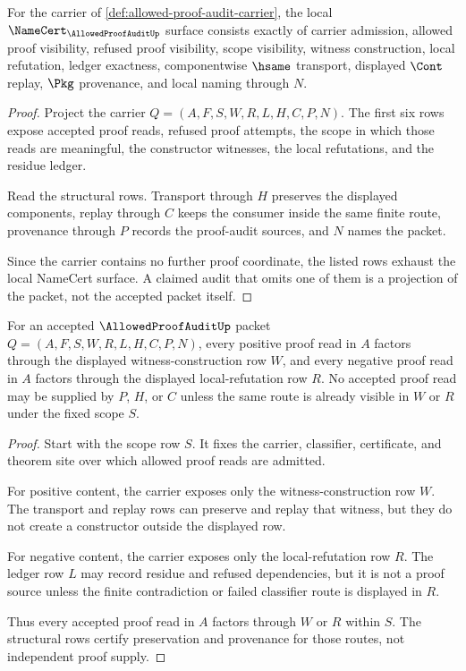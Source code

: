 \begin{theorem}
\label{thm:allowed-proof-audit-namecert-obligations}
For the carrier of \autoref{def:allowed-proof-audit-carrier}, the local $\NameCert_{\AllowedProofAuditUp}$ surface consists exactly of carrier admission, allowed proof visibility, refused proof visibility, scope visibility, witness construction, local refutation, ledger exactness, componentwise $\hsame$ transport, displayed $\Cont$ replay, $\Pkg$ provenance, and local naming through $N$.
\end{theorem}
\begin{proof}
Project the carrier $Q=(A,F,S,W,R,L,H,C,P,N)$. The first six rows expose accepted proof reads, refused proof attempts, the scope in which those reads are meaningful, the constructor witnesses, the local refutations, and the residue ledger.

Read the structural rows. Transport through $H$ preserves the displayed components, replay through $C$ keeps the consumer inside the same finite route, provenance through $P$ records the proof-audit sources, and $N$ names the packet.

Since the carrier contains no further proof coordinate, the listed rows exhaust the local NameCert surface. A claimed audit that omits one of them is a projection of the packet, not the accepted packet itself.
\end{proof}

\begin{theorem}
\label{thm:allowed-proof-audit-witness-construction}
For an accepted $\AllowedProofAuditUp$ packet $Q=(A,F,S,W,R,L,H,C,P,N)$, every positive proof read in $A$ factors through the displayed witness-construction row $W$, and every negative proof read in $A$ factors through the displayed local-refutation row $R$. No accepted proof read may be supplied by $P$, $H$, or $C$ unless the same route is already visible in $W$ or $R$ under the fixed scope $S$.
\end{theorem}
\begin{proof}
Start with the scope row $S$. It fixes the carrier, classifier, certificate, and theorem site over which allowed proof reads are admitted.

For positive content, the carrier exposes only the witness-construction row $W$. The transport and replay rows can preserve and replay that witness, but they do not create a constructor outside the displayed row.

For negative content, the carrier exposes only the local-refutation row $R$. The ledger row $L$ may record residue and refused dependencies, but it is not a proof source unless the finite contradiction or failed classifier route is displayed in $R$.

Thus every accepted proof read in $A$ factors through $W$ or $R$ within $S$. The structural rows certify preservation and provenance for those routes, not independent proof supply.
\end{proof}

